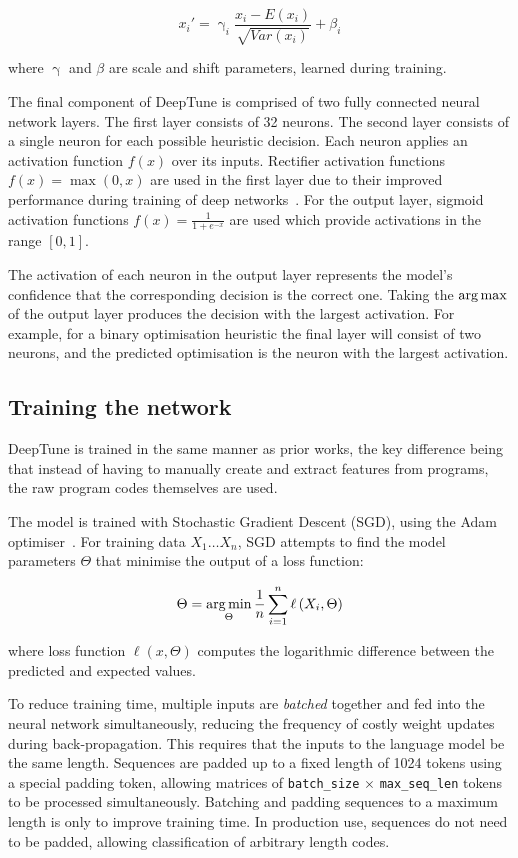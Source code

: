 \begin{equation}
x_i' = \upgamma_i \frac{x_i - E(x_i)}{\sqrt{Var(x_i)}} + \beta_i
\end{equation}

where $\upgamma$ and $\beta$ are scale and shift parameters, learned during training.

The final component of DeepTune is comprised of two fully connected neural network layers. The first layer consists of 32 neurons. The second layer consists of a single neuron for each possible heuristic decision. Each neuron applies an activation function $f(x)$ over its inputs. Rectifier activation functions $f(x) = \max(0, x)$ are used in the first layer due to their improved performance during training of deep networks~\cite{Nair2010}. For the output layer, sigmoid activation functions $f(x) = \frac{1}{1+e^{-x}}$ are used which provide activations in the range $[0,1]$.

The activation of each neuron in the output layer represents the model's confidence that the corresponding decision is the correct one. Taking the $\operatorname*{arg\,max}$ of the output layer produces the decision with the largest activation. For example, for a binary optimisation heuristic the final layer will consist of two neurons, and the predicted optimisation is the neuron with the largest activation.


\subsection{Training the network}

DeepTune is trained in the same manner as prior works, the key difference being that instead of having to manually create and extract features from programs, the raw program codes themselves are used.

The model is trained with Stochastic Gradient Descent (SGD), using the Adam optimiser~\cite{Kingma2015}. For training data $X_1 \ldots X_n$, SGD attempts to find the model parameters $\Theta$ that minimise the output of a loss function:

\begin{equation}
\Theta = \operatorname*{arg\,min}_{\Theta} \frac{1}{n} \sum_{i=1}^{n} \ell \left(X_i, \Theta \right)
\end{equation}

where loss function $\ell \left(x, \Theta \right)$ computes the logarithmic difference between the predicted and expected values.

To reduce training time, multiple inputs are \emph{batched} together and fed into the neural network simultaneously, reducing the frequency of costly weight updates during back-propagation. This requires that the inputs to the language model be the same length. Sequences are padded up to a fixed length of 1024 tokens using a special padding token, allowing matrices of \texttt{batch\_size} $\times$ \texttt{max\_seq\_len} tokens to be processed simultaneously. Batching and padding sequences to a maximum length is only to improve training time. In production use, sequences do not need to be padded, allowing classification of arbitrary length codes.
